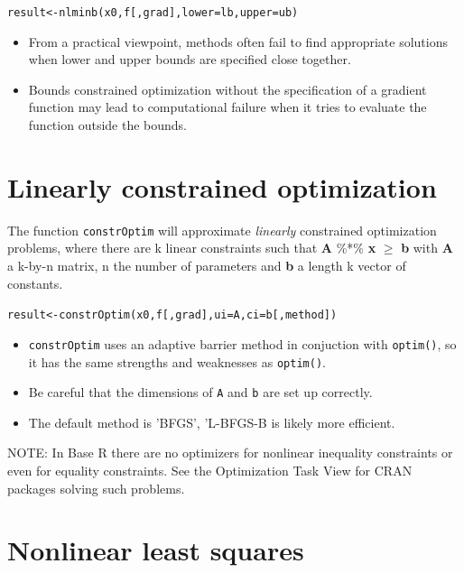 \documentclass[9pt,a4paper,onecolumn,oneside]{extarticle}
\begin{document}
\begin{landscape}
\begin{multicols}{2}
\begin{alltt}
 result <- nlminb(x0, f [, grad], lower = lb, upper = ub)
\end{alltt}

\begin{itemize}
\item
  From a practical viewpoint, methods often fail to find appropriate
  solutions when lower and upper bounds are specified close together.
\item
  Bounds constrained optimization without the specification of a
  gradient function may lead to computational failure when it tries 
  to evaluate the function outside the bounds.
\end{itemize}


\section*{\color{darkred} Linearly constrained optimization}

The function \texttt{constrOptim} will approximate \textit{linearly} 
constrained optimization problems, where there are k linear constraints 
such that \textbf{A} \%*\% \textbf{x} $\ge$ \textbf{b}
with \textbf{A} a k-by-n matrix, n the number of parameters and
\textbf{b} a length k vector of constants.

\begin{alltt}
 result <- constrOptim(x0, f [, grad], ui=A, ci=b [, method])
\end{alltt}

\begin{itemize}
\item
  \texttt{constrOptim} uses an adaptive barrier method in conjuction
  with \texttt{optim()}, so it has the same strengths and weaknesses as
  \texttt{optim()}.
\item
  Be careful that the dimensions of \texttt{A} and \texttt{b} are set
  up correctly.
\item
  The default method is 'BFGS', 'L-BFGS-B is likely more efficient.
\end{itemize}

NOTE: In Base R there are no optimizers for nonlinear inequality constraints
or even for equality constraints. See the Optimization Task View for CRAN 
packages solving such problems.



\section*{\color{darkred} Nonlinear least squares}


\end{multicols}
\end{landscape}
\end{document}
